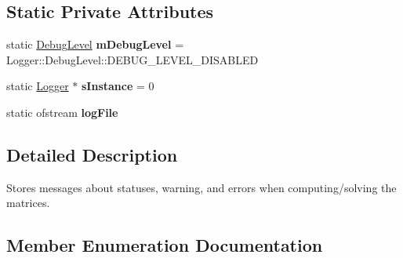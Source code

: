 \subsection*{Static Private Attributes}
\begin{DoxyCompactItemize}
\item 
\hypertarget{class_logger_a1de99a8f82ce147c2bf9a3dbb10691ee}{}static \hyperlink{class_logger_a96ecc57d01700c7b14d101f0f65a9932}{Debug\+Level} {\bfseries m\+Debug\+Level} = Logger\+::\+Debug\+Level\+::\+D\+E\+B\+U\+G\+\_\+\+L\+E\+V\+E\+L\+\_\+\+D\+I\+S\+A\+B\+L\+E\+D\label{class_logger_a1de99a8f82ce147c2bf9a3dbb10691ee}

\item 
\hypertarget{class_logger_adb66affbab16471bafe6cf45d239b769}{}static \hyperlink{class_logger}{Logger} $\ast$ {\bfseries s\+Instance} = 0\label{class_logger_adb66affbab16471bafe6cf45d239b769}

\item 
\hypertarget{class_logger_afb5b8b5e7e652500d175660d5e05a433}{}static ofstream {\bfseries log\+File}\label{class_logger_afb5b8b5e7e652500d175660d5e05a433}

\end{DoxyCompactItemize}


\subsection{Detailed Description}
Stores messages about statuses, warning, and errors when computing/solving the matrices. 

\subsection{Member Enumeration Documentation}
\hypertarget{class_logger_a96ecc57d01700c7b14d101f0f65a9932}{}
